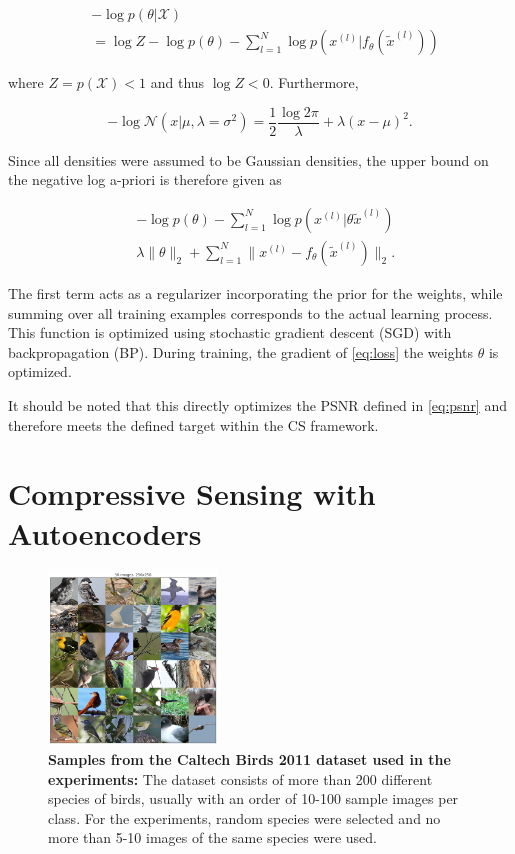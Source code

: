 \documentclass[10pt,twocolumn,a4paper]{article}
\newcommand{\abbr}[2]{#1 (#2)}
\newcommand{\normal}{\mathcal N}
\newcommand{\tx}{\tilde x}
\newcommand{\ds}{\mathcal X}
\begin{document}
\begin{align}
    &-\log p(\theta | \ds) \\
    &=   \log{Z} - \log p(\theta) - \sum_{l = 1}^{N} \log p(x^{(l)} | f_\theta(\tx^{(l)}))
\end{align}

where $Z = p(\ds) < 1$ and thus $\log Z < 0$.
Furthermore,

\begin{equation}
    - \log \normal (x | \mu, \lambda=\sigma^2) = \frac{1}{2} \frac{\log 2 \pi}{\lambda} + \lambda (x - \mu)^2 .
\end{equation}

Since all densities were assumed to be Gaussian densities, the upper bound on the negative log a-priori is therefore given as

\begin{align}
    &- \log p(\theta) - \sum_{l = 1}^{N} \log p(x^{(l)} | \theta \tx^{(l)}) \\
    &\lambda \|\theta\|_2  + \sum_{l = 1}^{N} \|x^{(l)} - f_\theta(\tx^{(l)})\|_2 . \label{eq:loss}
\end{align}

The first term acts as a regularizer incorporating the prior for the weights, while summing over all training examples corresponds to the actual learning process.
This function is optimized using \abbr{stochastic gradient descent}{SGD} with \abbr{backpropagation}{BP}.
During training, the gradient of \eqref{eq:loss} \wrt the weights $\theta$ is optimized.

It should be noted that this directly optimizes the PSNR defined in \eqref{eq:psnr} and therefore meets the defined target within the CS framework.

\section{Compressive Sensing with Autoencoders}

\begin{figure}
\begin{center}
\includegraphics[width=0.4\textwidth]{fig/birds}
\end{center}
   \caption{
       \textbf{Samples from the Caltech Birds 2011 dataset used in the experiments:}
       The dataset consists of more than 200 different species of birds, usually with an order of 10-100 sample images per class. For the experiments, random species were selected and no more than 5-10 images of the same species were used.
   }
\label{fig:dataset}
\end{figure}
\end{document}
